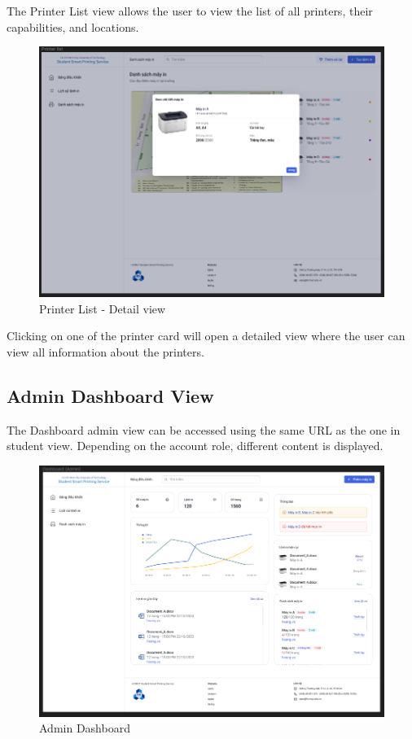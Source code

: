The Printer List view allows the user to view the list of all printers, their capabilities, and locations.

\begin{figure}[H]
  \includegraphics[max width=0.9\linewidth]{chapters/5. mvp-wireframe/8. Printer List - Details.png}
  \caption{Printer List - Detail view}%
\end{figure}

Clicking on one of the printer card will open a detailed view where the user can view all information about the printers.

\subsection{Admin Dashboard View}

The Dashboard admin view can be accessed using the same URL as the one in student view. Depending on the account role, different content is displayed.

\begin{figure}[H]
  \includegraphics[max width=0.9\linewidth]{chapters/5. mvp-wireframe/9. Dashboard Admin.png}
  \caption{Admin Dashboard}%
\end{figure}

